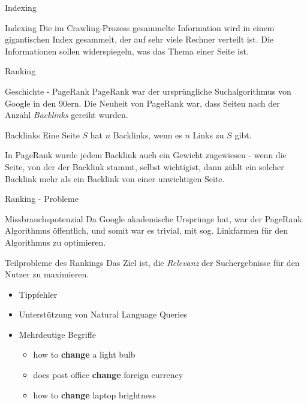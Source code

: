 \documentclass[11pt]{beamer}
\begin{document}
\begin{frame}{Indexing}
    \begin{block}{Indexing}
        Die im Crawling-Prozess gesammelte Information wird in einem gigantischen Index gesammelt, der auf sehr viele Rechner verteilt ist. Die Informationen sollen widerspiegeln, was das Thema einer Seite ist.
    \end{block}
    
\end{frame}

\begin{frame}{Ranking}
    \begin{block}{Geschichte - PageRank}
        PageRank war der ursprüngliche Suchalgorithmus von Google in den 90ern. Die Neuheit von PageRank war, dass Seiten nach der Anzahl \textit{Backlinks} gereiht wurden.
    \end{block}
    
    \begin{block}{Backlinks}
        Eine Seite $S$ hat $n$ Backlinks, wenn es $n$ Links zu $S$ gibt.
    \end{block}
    
    In PageRank wurde jedem Backlink auch ein Gewicht zugewiesen - wenn die Seite, von der der Backlink stammt, selbst \dq wichtig\dq ist, dann zählt ein solcher Backlink mehr als ein Backlink von einer unwichtigen Seite.
\end{frame}

\begin{frame}{Ranking - Probleme}

    \begin{block}{Missbrauchspotenzial}
        Da Google akademische Ursprünge hat, war der PageRank Algorithmus öffentlich, und somit war es trivial, mit sog. Linkfarmen für den Algorithmus zu optimieren.
    \end{block}
    
    \begin{block}{Teilprobleme des Rankings}
        Das Ziel ist, die \textit{Relevanz} der Suchergebnisse für den Nutzer zu maximieren.
        \begin{itemize}
            \item Tippfehler
            \item Unterstützung von Natural Language Queries
            \item Mehrdeutige Begriffe
            \begin{itemize}
                \item \dq how to \textbf{change} a light bulb\dq
                \item \dq does post office \textbf{change} foreign currency\dq
                \item \dq how to \textbf{change} laptop brightness\dq
            \end{itemize}
        \end{itemize}
    \end{block}
\end{frame}
\end{document}
